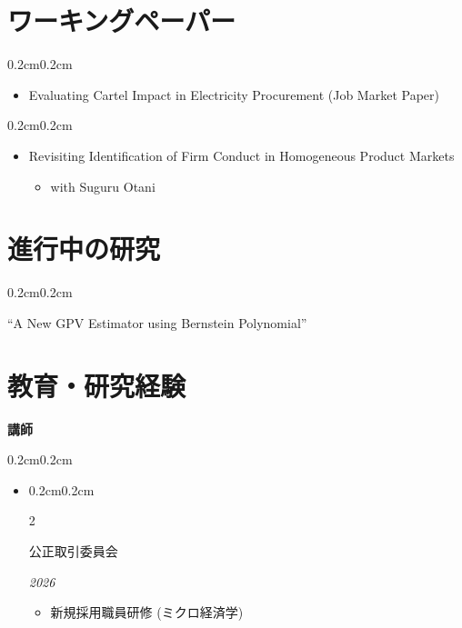 \documentclass[10pt, letterpaper]{article}
\newenvironment{highlights}{
    \begin{itemize}[
        topsep=0.10cm,
        parsep=0.10cm,
        partopsep=0pt,
        itemsep=0.0cm,
        leftmargin=0.4cm + 10pt
    ]
}{
    \end{itemize}
}
\newenvironment{onecolentry}{
    \begin{adjustwidth}{0.2cm}{0.2cm}
}{
    \end{adjustwidth}
}
\newenvironment{twocolentry}[2][]{
    \onecolentry
    \def\secondColumn{#2}
    \setcolumnwidth{\fill, 4.5cm}
    \begin{paracol}{2}
}{
    \switchcolumn \raggedleft \secondColumn
    \end{paracol}
    \end{adjustwidth}
}
\begin{document}
    \section{ワーキングペーパー}
    \begin{samepage}
        \begin{onecolentry}
            \begin{highlights}
                \item Evaluating Cartel Impact in Electricity Procurement (Job Market Paper)
            \end{highlights}
        \end{onecolentry}
    \end{samepage}
    \vspace{0.10cm}
    \begin{samepage}
        \begin{onecolentry}
            \begin{highlights}
                \item Revisiting Identification of Firm Conduct in Homogeneous Product Markets
                \begin{highlights}
                    \item with Suguru Otani
                \end{highlights}
            \end{highlights}
        \end{onecolentry}
    \end{samepage}

    \section{進行中の研究}
    \begin{onecolentry}
        ``A New GPV Estimator using Bernstein Polynomial''
    \end{onecolentry}

    \section{教育・研究経験}
    \textbf{講師}
    \vspace{0.10cm}
    \begin{onecolentry}
        \begin{highlights}
            \item \begin{twocolentry}{\textit{2026}}
                公正取引委員会
            \end{twocolentry}
            \begin{highlights}
                \item 新規採用職員研修 (ミクロ経済学)
            \end{highlights}
        \end{highlights}
    \end{onecolentry}
\end{document}
